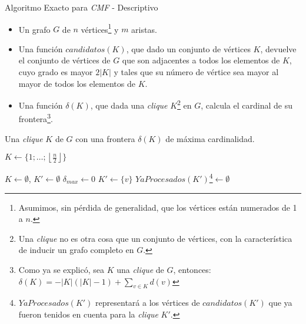 \begin{minipage}{\textwidth}%
    \begin{algorithm}[H]
        \caption{Algoritmo Exacto para \emph{CMF} - Descriptivo}
        \begin{algorithmic}[1]
            \Require\Statex
                \begin{itemize}
                    \item Un grafo $G$ de $n$ v\'ertices\footnote{Asumimos, sin p\'erdida 
                        de generalidad, que los v\'ertices est\'an numerados de 1 a $n$.}
                        y $m$ aristas.

                    \item Una funci\'on $candidatos(K)$, que dado un conjunto de v\'ertices
                        $K$, devuelve el conjunto de v\'ertices de $G$ que son adjacentes
                        a todos los elementos de $K$, cuyo grado es mayor $2|K|$ y tales
                        que su n\'umero de v\'ertice sea mayor al mayor de todos los elementos
                        de $K$.

                    \item Una funci\'on $\delta(K)$, que dada una \emph{clique} $K$\footnote{Una
                        \emph{clique} no es otra cosa que un conjunto de v\'ertices, con la
                        caracter\'istica de inducir un grafo completo en $G$.} en $G$, calcula
                        el cardinal de su frontera\footnote{Como ya se explic\'o, sea $K$ una
                        \emph{clique} de $G$, entonces: $\delta(K) = - |K|(|K|-1) +
                        \displaystyle\sum_{v \in K} d(v)$}.

                \end{itemize}
            \Statex
            \Ensure Una \emph{clique} $K$ de $G$ con una frontera $\delta(K)$ de m\'axima
                cardinalidad.

            \Statex

             
                \State $K \gets \{1;\dots;\left\lfloor\frac{n}{2}\right\rfloor\}$

            \Else
            \State $K \gets \emptyset$, $K' \gets \emptyset$
                \State $\delta_{max} \gets 0$
                    \State $K' \gets \{v\}$
                    \State $YaProcesados(K')$\footnote{$YaProcesados(K')$ representar\'a a
                        los v\'ertices de $candidatos(K')$ que ya fueron tenidos en cuenta
                        para la \emph{clique} $K'$.}$ \gets \emptyset$


\end{algorithmic}
\end{algorithm}
\end{minipage}
